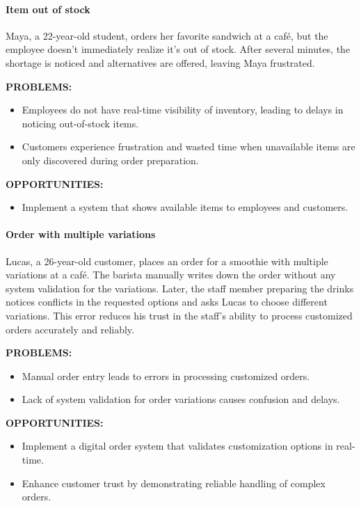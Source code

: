 \documentclass[]{VUMIFTemplateClass}
\newcommand{\subsubsubsection}[1]{\paragraph{#1}}
\begin{document}
\subsubsubsection{Item out of stock}
\label{subsubsubsec:item-out-of-stock}
Maya, a 22-year-old student, orders her favorite sandwich at a café, but the employee doesn’t immediately realize it’s out of stock. After several minutes, the shortage is noticed and alternatives are offered, leaving Maya frustrated.

\textbf{PROBLEMS:}
\begin{itemize}
    \item Employees do not have real-time visibility of inventory, leading to delays in noticing out-of-stock items.  
    \item Customers experience frustration and wasted time when unavailable items are only discovered during order preparation.  
\end{itemize}

\textbf{OPPORTUNITIES:}
\begin{itemize}
    \item Implement a system that shows available items to employees and customers.
\end{itemize}

\subsubsubsection{Order with multiple variations}
\label{subsubsubsec:multiple-variations}

Lucas, a 26-year-old customer, places an order for a smoothie with multiple
variations at a café. The barista manually writes down the order without any
system validation for the variations. Later, the staff member preparing the
drinks notices conflicts in the requested options and asks Lucas to choose
different variations. This error reduces his trust in the staff’s ability to
process customized orders accurately and reliably.

\textbf{PROBLEMS:}
\begin{itemize}
    \item Manual order entry leads to errors in processing customized orders.
    \item Lack of system validation for order variations causes confusion and delays.
\end{itemize}

\textbf{OPPORTUNITIES:}
\begin{itemize}
    \item Implement a digital order system that validates customization options in real-time.
    \item Enhance customer trust by demonstrating reliable handling of complex orders.
\end{itemize}
\end{document}
